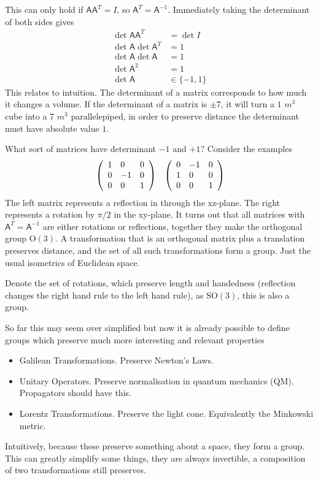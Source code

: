 \documentclass[floatfix,aps,prd,amsmath,amssymb]{revtex4}
\begin{document}
This can only hold if $\mathsf{A}\mathsf{A}^T=I$, so $\mathsf{A}^T = \mathsf{A}^{-1}$. Immediately taking the determinant of both sides gives
\begin{align*}
\det \mathsf{A}\mathsf{A}^T &= \det I \\
\det \mathsf{A} \det \mathsf{A}^T &= 1 \\
\det \mathsf{A} \det \mathsf{A} &= 1 \\
\det \mathsf{A}^2 &= 1 \\
\det \mathsf{A} &\in \{-1,1\}
\end{align*}
This relates to intuition. The determinant of a matrix corresponds to how much it changes a volume. If the determinant of a matrix is $\pm 7$, it will turn a $1$ $m^3$ cube into a $7$ $m^3$ parallelepiped, in order to preserve distance the determinant must have absolute value $1$.

What sort of matrices have determinant $-1$ and $+1$? Consider the examples
\begin{align*}
&\left( \begin{array}{l l l}
1 &0&0 \\
0&-1&0 \\
0&0&1
\end{array} \right) & \left( \begin{array}{l l l}
0&-1&0 \\
1&0&0 \\
0&0&1
\end{array} \right)
\end{align*}
The left matrix represents a reflection in through the xz-plane. The right represents a rotation by $\pi/2$ in the xy-plane. It turns out that all matrices with $\mathsf{A}^T = \mathsf{A}^{-1}$ are either rotations or reflections, together they make the orthogonal group $\mathrm{O}(3)$. A transformation that is an orthogonal matrix plus a translation preserves distance, and the set of all such transformations form a group. Just the usual isometrics of Euclidean space.

Denote the set of rotations, which preserve length and handedness (reflection changes the right hand rule to the left hand rule), as $\mathrm{SO}(3)$, this is also a group.

So far this may seem over simplified but now it is already possible to define groups which preserve much more interesting and relevant properties
\begin{itemize}
\item Galilean Transformations. Preserve Newton's Laws.
\item Unitary Operators. Preserve normalisation in quantum mechanics (QM). Propagators should have this.
\item Lorentz Transformations. Preserve the light cone. Equivalently the Minkowski metric.
\end{itemize}
Intuitively, because these preserve something about a space, they form a group. This can greatly simplify some things, they are always invertible, a composition of two transformations still preserves.
\end{document}
